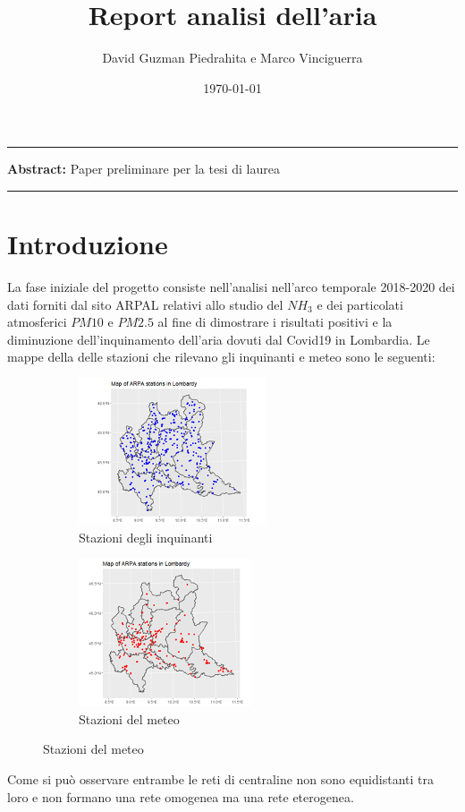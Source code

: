 \documentclass{article}
\title{Report analisi dell'aria}
\author{David Guzman Piedrahita e Marco Vinciguerra}
\date{\today}
\begin{document}
\maketitle

\par\noindent\rule{\textwidth}{0.4pt}
\textbf{Abstract:} Paper preliminare per la tesi di laurea
\par\noindent\rule{\textwidth}{0.4pt}

\section{Introduzione}
La fase iniziale del progetto consiste nell'analisi nell'arco temporale 2018-2020 dei dati 
forniti dal sito ARPAL relativi allo studio del $NH_{3}$ e dei particolati atmosferici $PM10$ e $PM2.5$ al 
fine di dimostrare i risultati positivi e la diminuzione dell'inquinamento dell'aria 
dovuti dal Covid19 in Lombardia. Le mappe della delle stazioni che rilevano gli inquinanti e meteo sono le 
seguenti:
\begin{figure}
    \centering
    \begin{subfigure}{.5\textwidth}
      \centering
      \includegraphics[width=.7\linewidth]{Lpollution.png}
      \caption{Stazioni degli inquinanti}
      \label{fig:sub1}
    \end{subfigure}%
    \begin{subfigure}{.5\textwidth}
      \centering
      \includegraphics[width=.7\linewidth]{Lweather.png}
      \caption{Stazioni del meteo}
      \label{fig:sub2}
    \end{subfigure}
    \label{fig:test}
\end{figure}
Come si può osservare entrambe le reti di centraline non sono equidistanti tra loro e non formano 
una rete omogenea ma una rete eterogenea.
\end{document}

